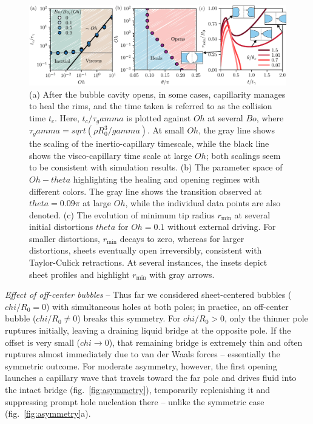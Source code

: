 \documentclass[reprint,amssymb,superscriptaddress,aps,prl,floatfix]{revtex4-2}
\def\chi{chi}%
\def\theta{theta}%
\def\gamma{gamma}%
\def\sqrt#1{sqrt(#1)}%
\begin{document}
\begin{figure}
 	\includegraphics{Oh-shape_08.pdf}
  \caption{ (a) After the bubble cavity opens, in some cases, capillarity manages to heal
    the rims, and the time taken is referred to as the collision time $t_c$. Here,
    $t_c/\tau_\gamma$ is plotted against $Oh$ at several $Bo$, where $\tau_\gamma =
    \sqrt{\rho R_0^3/\gamma}$. At small $Oh$, the gray line shows the scaling of the
    inertio-capillary timescale, while the black line shows the visco-capillary time scale
    at large $Oh$; both scalings seem to be consistent with simulation results. (b) The parameter space of $Oh-\theta$ highlighting the healing and opening regimes with different colors. The gray line shows the transition
    observed at $\theta = 0.09\pi$ at large $Oh$, while the individual data points are
    also denoted. (c) The evolution of minimum tip radius $r_{\text{min}}$ at several
    initial distortions $\theta$ for $Oh = 0.1$ without external driving. For smaller
  distortions, $r_{\text{min}}$ decays to zero, whereas for larger distortions, sheets eventually 
open irreversibly, consistent with Taylor-Culick retractions. At several instances, the insets depict sheet profiles and highlight $r_{\text{min}}$ with gray arrows.
 	\label{fig:shape}}
 \end{figure}

{\it Effect of off-center bubbles} --
Thus far we considered sheet-centered bubbles ($\chi/R_0 = 0$) with simultaneous holes at
both poles; in practice, an off-center bubble ($\chi/R_0 \neq 0$) breaks this symmetry.
For $\chi/R_0 > 0$, only the thinner pole ruptures initially, leaving a draining liquid
bridge at the opposite pole. If the offset is very small ($\chi \to 0$), that remaining
bridge is extremely thin and often ruptures almost immediately due to van der Waals forces
-- essentially the symmetric outcome.
For moderate asymmetry, however, the first opening launches a capillary wave that travels
toward the far pole and drives fluid into the intact bridge (fig.~\ref{fig:asymmetry}),
temporarily replenishing it and suppressing prompt hole nucleation there -- unlike the
symmetric case (fig.~\ref{fig:asymmetry}a). 
\end{document}
